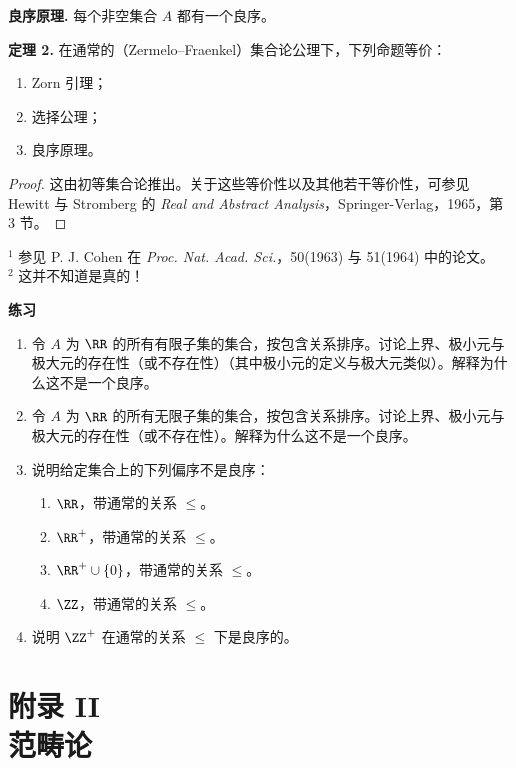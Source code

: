\medskip
\noindent\textbf{良序原理.} 每个非空集合 $A$ 都有一个良序。

\medskip
\noindent\textbf{定理 2.} 在通常的（Zermelo--Fraenkel）集合论公理下，下列命题等价：
\begin{enumerate}[label=(\arabic*)]
  \item Zorn 引理；
  \item 选择公理；
  \item 良序原理。
\end{enumerate}

\begin{proof}
这由初等集合论推出。关于这些等价性以及其他若干等价性，可参见 Hewitt 与 Stromberg 的 \emph{Real and Abstract Analysis}，Springer-Verlag，1965，第 3 节。
\end{proof}

\noindent$^{1}$ 参见 P. J. Cohen 在 \emph{Proc. Nat. Acad. Sci.}，50(1963) 与 51(1964) 中的论文。\\
$^{2}$ 这并不知道是真的！

\begin{center}
\textbf{练习}
\end{center}

\begin{enumerate}[label=\arabic*.]
  \item 令 $A$ 为 $\RR$ 的所有有限子集的集合，按包含关系排序。讨论上界、极小元与极大元的存在性（或不存在性）（其中极小元的定义与极大元类似）。解释为什么这不是一个良序。

  \item 令 $A$ 为 $\RR$ 的所有无限子集的集合，按包含关系排序。讨论上界、极小元与极大元的存在性（或不存在性）。解释为什么这不是一个良序。

  \item 说明给定集合上的下列偏序不是良序：
  \begin{enumerate}[label=(\alph*)]
    \item $\RR$，带通常的关系 $\leq$。
    \item $\RR^+$，带通常的关系 $\leq$。
    \item $\RR^+\cup\{0\}$，带通常的关系 $\leq$。
    \item $\ZZ$，带通常的关系 $\leq$。
  \end{enumerate}

  \item 说明 $\ZZ^+$ 在通常的关系 $\leq$ 下是良序的。
\end{enumerate}

\chapter*{附录 II\\范畴论}

